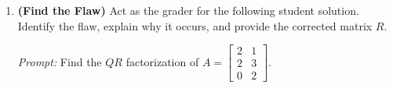 \documentclass[11pt, letterpaper]{article}
\theoremstyle{definition}
\theoremstyle{remark}
\begin{document}
\begin{enumerate}[label=\textbf{Problem \arabic*.}, leftmargin=*, itemsep=0.9em]
    \emph{Student's Solution:}
    \begin{align*}
        v_1 &= \begin{bmatrix} 3 \\ 0 \\ 4 \end{bmatrix}, \qquad
        v_2 = \begin{bmatrix} 10 \\ 5 \\ 5 \end{bmatrix} - \frac{50}{25}\begin{bmatrix} 3 \\ 0 \\ 4 \end{bmatrix} = \begin{bmatrix} 4 \\ 5 \\ -3 \end{bmatrix}, \\
        Q &= \begin{bmatrix} 3 & 4 \\ 0 & 5 \\ 4 & -3 \end{bmatrix}, \qquad
        R = Q^T A = \begin{bmatrix} 3 & 0 & 4 \\ 4 & 5 & -3 \end{bmatrix} \begin{bmatrix} 3 & 10 \\ 0 & 5 \\ 4 & 5 \end{bmatrix} = \begin{bmatrix} 25 & 50 \\ 0 & 50 \end{bmatrix}.
    \end{align*}

    \item \textbf{(Find the Flaw)} Act as the grader for the following student solution. Identify the flaw, explain why it occurs, and provide the corrected matrix $R$.
    
    \emph{Prompt:} Find the $QR$ factorization of $A = \begin{bmatrix} 2 & 1 \\ 2 & 3 \\ 0 & 2 \end{bmatrix}$.
    

\end{enumerate}
\end{document}
